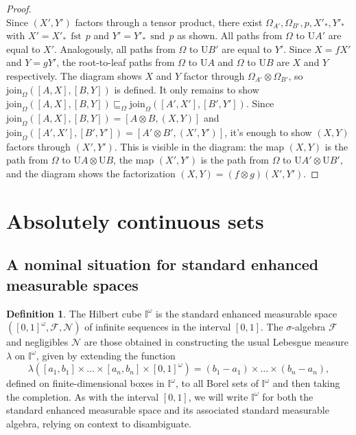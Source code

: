 \documentclass[
  sigconf,
  screen, ]{acmart}
\theoremstyle{definition}
\newtheorem{definition}[theorem]{Definition}
\newcommand\calF{\mathcal F}
\newcommand\calN{\mathcal N}
\newcommand\nref[2]{\hyperref[#1]{#2}} \newcommand\checkhigh{{\huge{\color{red}\textbf{TODO: check}}}}
\newcommand\scmfst{\mathop{\nref{app:def:semicartesian-monoidal-category}{\mathrm{fst}}}}
\newcommand\scmsnd{\mathop{\nref{app:def:semicartesian-monoidal-category}{\mathrm{snd}}}}
\newcommand\texforgetmu{\mathrm{U}}
\newcommand\forgetmu{{\nref{def:forgetmu}{\texforgetmu}}}
\newcommand\texhcube{{{{\mathbb I}^\omega}}}
\newcommand\hcube{{\nref{def:hcube}{\texhcube}}}
\newcommand\texAgoodname{Absolutely continuous set}
\newcommand\Agoodnamenolink{\texAgoodname}
\newcommand\texStdMble{\mathbf{EMS}_{\rm std}}
\newcommand\StdMble{{\nref{def:mblecat}{\texStdMble}}}
\newcommand\pcmjoin{{\nref{app:def:pspcs-tensor-join}{\mathrm{join}}}}
\begin{document}
\begin{proof}
\[\]
  Since $(X',Y')$
  factors through a tensor product,
  there exist $\Omega_{A'},\Omega_{B'},p,X'_*,Y'_*$ with
  $X' = X'_*\,\scmfst \,p$ and $Y' = Y'_*\,\scmsnd \,p$ as shown.
  All paths from $\Omega$ to $\forgetmu{A'}$ are equal to $X'$.
  Analogously, all paths from $\Omega$ to $\forgetmu{B'}$ are equal to $Y'$.
  Since $X = fX'$ and $Y = gY'$, the root-to-leaf paths from $\Omega$
  to $\forgetmu A$ and $\Omega$ to $\forgetmu B$
  are $X$ and $Y$ respectively.
  The diagram shows $X$ and $Y$ factor through $\Omega_{A'}\otimes\Omega_{B'}$,
  so $\pcmjoin_\Omega([A,X],[B,Y])$ is defined.
  It only remains to show
  $\pcmjoin_\Omega([A,X],[B,Y])\sqsubseteq_\Omega
  \pcmjoin_\Omega([A',X'],[B',Y'])$.
  Since $\pcmjoin_\Omega([A,X],[B,Y]) = [A\otimes B, (X,Y)]$
  and $\pcmjoin_\Omega([A',X'],[B',Y']) = [A'\otimes B', (X', Y')]$,
  it's enough to show $(X,Y)$ factors through $(X',Y')$.
  This is visible in the diagram:
  the map $(X,Y)$ is the path from $\Omega$
  to $\forgetmu A\otimes\forgetmu B$,
  the map $(X',Y')$ is the path from $\Omega$
  to $\forgetmu{A'}\otimes\forgetmu{B'}$,
  and the diagram shows
  the factorization $(X,Y) = (f\otimes g)(X',Y')$.
\end{proof}

\section{\Agoodnamenolink{s}} \label{app:sec:agoodnames}

\subsection{A nominal situation for standard enhanced measurable spaces}

\newcommand\micat{{\nref{app:def:micat}{\hcube\StdMble}}}
\newcommand\rami{{\nref{app:def:rami}{\hcube\mathbf{EMS}_{\rm std}^{\rm{ff}}}}}

\begin{definition} \label{app:def:hcube}
  The Hilbert cube $\hcube$ is the standard enhanced measurable space $([0,1]^\omega,\calF,\calN)$
  of infinite sequences in the interval $[0,1]$.
  The $\sigma$-algebra $\calF$
  and negligibles $\calN$ are those obtained in constructing the usual Lebesgue measure $\lambda$
  on $\hcube$, given by extending the function
  \[ \lambda([a_1,b_1]\times\dots\times[a_n,b_n] \times [0,1]^\omega) = 
     (b_1 - a_1)\times\dots\times(b_n - a_n),
    \]
  defined on finite-dimensional boxes in $\hcube$,
  to all Borel sets of $\hcube$ and then taking the completion.
  As with the interval $[0,1]$, we will write $\hcube$
  for both the standard enhanced measurable space and its associated
  standard measurable algebra, relying on context to disambiguate.
\end{definition}
\end{document}
